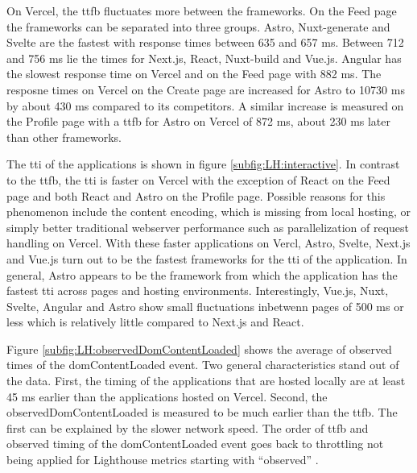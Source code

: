 \documentclass[a4paper, 10pt]{article}
\begin{document}
On Vercel, the \acrshort{ttfb} fluctuates more between the frameworks.
On the Feed page the frameworks can be separated into three groups.
Astro, Nuxt-generate and Svelte are the fastest with response times between 635 and 657 ms.
Between 712 and 756 ms lie the times for Next.js, React, Nuxt-build and Vue.js.
Angular has the slowest response time on Vercel and on the Feed page with 882 ms.
The resposne times on Vercel on the Create page are increased for Astro to 10730 ms by about 430 ms compared to its competitors.
A similar increase is measured on the Profile page with a \acrshort{ttfb} for Astro on Vercel of 872 ms, about 230 ms later than other frameworks.

The \acrlong{tti} of the applications is shown in figure \ref{subfig:LH:interactive}. In contrast to the \acrshort{ttfb}, the \acrshort{tti} is faster on Vercel with the exception of React on the Feed page and both React and Astro on the Profile page.
Possible reasons for this phenomenon include the content encoding, which is missing from local hosting, or simply better traditional webserver performance such as parallelization of request handling on Vercel.
With these faster applications on Vercl, Astro, Svelte, Next.js and Vue.js turn out to be the fastest frameworks for the \acrlong{tti} of the application.
In general, Astro appears to be the framework from which the application has the fastest \acrshort{tti} across pages and hosting environments.
Interestingly, Vue.js, Nuxt, Svelte, Angular and Astro show small fluctuations inbetwenn pages of 500 ms or less which is relatively little compared to Next.js and React.

Figure \ref{subfig:LH:observedDomContentLoaded} shows the average of observed times of the domContentLoaded event.
Two general characteristics stand out of the data.
First, the timing of the applications that are hosted locally are at least 45 ms earlier than the applications hosted on Vercel.
Second, the observedDomContentLoaded is measured to be much earlier than the \acrshort{ttfb}.
The first can be explained by the slower network speed.
The order of \acrshort{ttfb} and observed timing of the domContentLoaded event goes back to throttling not being applied for Lighthouse metrics starting with \enquote{observed} \citep{observedMetrics}.
\end{document}
